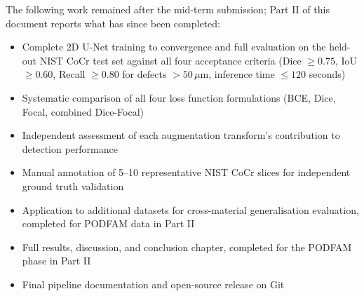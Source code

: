 The following work remained after the mid-term submission; Part II of this document reports what has
since been completed:
\begin{itemize}
\item Complete 2D U-Net training to convergence and full evaluation on the held-out NIST CoCr test
  set against all four acceptance criteria (Dice $\geq 0.75$, IoU $\geq 0.60$, Recall $\geq 0.80$ for
  defects $> 50\,\mu$m, inference time $\leq 120$ seconds)
\item Systematic comparison of all four loss function formulations (BCE, Dice, Focal, combined
  Dice-Focal)
\item Independent assessment of each augmentation transform's contribution to detection performance
\item Manual annotation of 5--10 representative NIST CoCr slices for independent ground truth
  validation
\item Application to additional datasets for cross-material generalisation evaluation, completed for
  PODFAM data in Part II
\item Full results, discussion, and conclusion chapter, completed for the PODFAM phase in Part II
\item Final pipeline documentation and open-source release on Git
\end{itemize}
